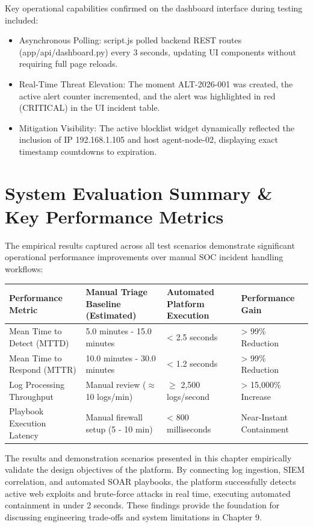 Key operational capabilities confirmed on the dashboard interface during testing included:

\begin{itemize}
  \item Asynchronous Polling: script.js polled backend REST routes (app/api/dashboard.py) every 3 seconds, updating UI components without requiring full page reloads.
  \item Real-Time Threat Elevation: The moment ALT-2026-001 was created, the active alert counter incremented, and the alert was highlighted in red (CRITICAL) in the UI incident table.
  \item Mitigation Visibility: The active blocklist widget dynamically reflected the inclusion of IP 192.168.1.105 and host agent-node-02, displaying exact timestamp countdowns to expiration.
\end{itemize}

\section{System Evaluation Summary \& Key Performance Metrics}

The empirical results captured across all test scenarios demonstrate significant operational performance improvements over manual SOC incident handling workflows:

\begin{table}[htbp]
\centering
\begin{tabular}{|P{3cm}|P{5cm}|P{3cm}|P{3cm}|}
\hline
Performance Metric & Manual Triage Baseline (Estimated) & Automated Platform Execution & Performance Gain \\ \hline
Mean Time to Detect (MTTD) & 5.0 minutes - 15.0 minutes & < 2.5 seconds & > 99\% Reduction \\ \hline
Mean Time to Respond (MTTR) & 10.0 minutes - 30.0 minutes & < 1.2 seconds & > 99\% Reduction \\ \hline
Log Processing Throughput & Manual review ($\approx$ 10 logs/min) & $\ge$ 2,500 logs/second & > 15,000\% Increase \\ \hline
Playbook Execution Latency & Manual firewall setup (5 - 10 min) & < 800 milliseconds & Near-Instant Containment \\ \hline
\end{tabular}
\end{table}

The results and demonstration scenarios presented in this chapter empirically validate the design objectives of the platform. By connecting log ingestion, SIEM correlation, and automated SOAR playbooks, the platform successfully detects active web exploits and brute-force attacks in real time, executing automated containment in under 2 seconds. These findings provide the foundation for discussing engineering trade-offs and system limitations in Chapter 9.

